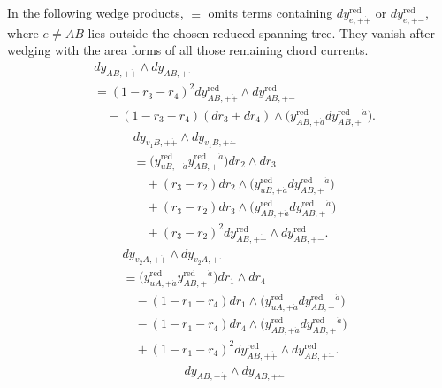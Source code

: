 \documentclass[11pt]{article}
\numberwithin{equation}{section}
\numberwithin{figure}{section}
\numberwithin{table}{section}
\begin{document}
\begin{proofbox}
In the following wedge products, $\equiv$ omits terms containing $dy_{e,+\dot+}^{\mathrm{red}}$ or $dy_{e,+\dot-}^{\mathrm{red}}$, where $e\ne AB$ lies outside the chosen reduced spanning tree. They vanish after wedging with the area forms of all those remaining chord currents.
\begin{equation*}
\begin{aligned}
&dy_{AB,+\dot+}\wedge dy_{AB,+\dot-}\\
&=(1-r_3-r_4)^2
 dy_{AB,+\dot+}^{\mathrm{red}}\wedge dy_{AB,+\dot-}^{\mathrm{red}}\\
&\quad-(1-r_3-r_4)(dr_3+dr_4)\wedge
\bigl(y_{AB,+\dot a}^{\mathrm{red}}dy_{AB,+}^{\mathrm{red}}{}^{\dot a}\bigr).
\end{aligned}
\end{equation*}
\begin{equation*}
\begin{aligned}
&dy_{v_1B,+\dot+}\wedge dy_{v_1B,+\dot-}\\
&\equiv
\bigl(y_{uB,+\dot a}^{\mathrm{red}}y_{AB,+}^{\mathrm{red}}{}^{\dot a}\bigr)
 dr_2\wedge dr_3\\
&\quad+(r_3-r_2)dr_2\wedge
\bigl(y_{uB,+\dot a}^{\mathrm{red}}dy_{AB,+}^{\mathrm{red}}{}^{\dot a}\bigr)\\
&\quad+(r_3-r_2)dr_3\wedge
\bigl(y_{AB,+\dot a}^{\mathrm{red}}dy_{AB,+}^{\mathrm{red}}{}^{\dot a}\bigr)\\
&\quad+(r_3-r_2)^2
 dy_{AB,+\dot+}^{\mathrm{red}}\wedge dy_{AB,+\dot-}^{\mathrm{red}}.
\end{aligned}
\end{equation*}
\begin{equation*}
\begin{aligned}
&dy_{v_2A,+\dot+}\wedge dy_{v_2A,+\dot-}\\
&\equiv
\bigl(y_{uA,+\dot a}^{\mathrm{red}}y_{AB,+}^{\mathrm{red}}{}^{\dot a}\bigr)
 dr_1\wedge dr_4\\
&\quad-(1-r_1-r_4)dr_1\wedge
\bigl(y_{uA,+\dot a}^{\mathrm{red}}dy_{AB,+}^{\mathrm{red}}{}^{\dot a}\bigr)\\
&\quad-(1-r_1-r_4)dr_4\wedge
\bigl(y_{AB,+\dot a}^{\mathrm{red}}dy_{AB,+}^{\mathrm{red}}{}^{\dot a}\bigr)\\
&\quad+(1-r_1-r_4)^2
 dy_{AB,+\dot+}^{\mathrm{red}}\wedge dy_{AB,+\dot-}^{\mathrm{red}}.
\end{aligned}
\end{equation*}
\begin{equation*}
\begin{aligned}
&dy_{AB,+\dot+}\wedge dy_{AB,+\dot-}

\end{aligned}
\end{equation*}
\end{proofbox}
\end{document}
